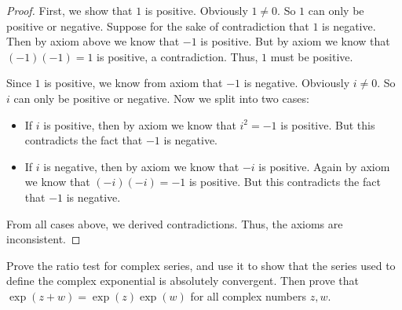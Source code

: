 \begin{proof}
  First, we show that \(1\) is positive.
  Obviously \(1 \neq 0\).
  So \(1\) can only be positive or negative.
  Suppose for the sake of contradiction that \(1\) is negative.
  Then by axiom above we know that \(-1\) is positive.
  But by axiom we know that \((-1)(-1) = 1\) is positive, a contradiction.
  Thus, \(1\) must be positive.

  Since \(1\) is positive, we know from axiom that \(-1\) is negative.
  Obviously \(i \neq 0\).
  So \(i\) can only be positive or negative.
  Now we split into two cases:
  \begin{itemize}
    \item If \(i\) is positive, then by axiom we know that \(i^2 = -1\) is positive.
          But this contradicts the fact that \(-1\) is negative.
    \item If \(i\) is negative, then by axiom we know that \(-i\) is positive.
          Again by axiom we know that \((-i)(-i) = -1\) is positive.
          But this contradicts the fact that \(-1\) is negative.
  \end{itemize}
  From all cases above, we derived contradictions.
  Thus, the axioms are inconsistent.
\end{proof}

\begin{ex}\label{ii:ex:4.6.16}
  Prove the ratio test for complex series, and use it to show that the series used to define the complex exponential is absolutely convergent.
  Then prove that \(\exp(z + w) = \exp(z) \exp(w)\) for all complex numbers \(z, w\).
\end{ex}

